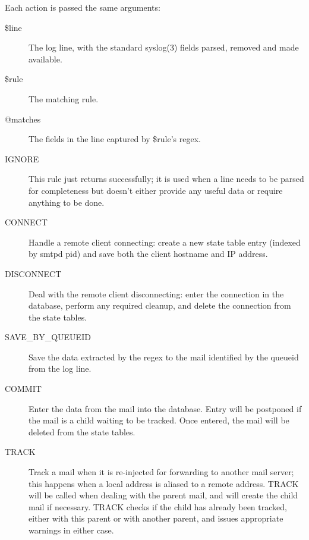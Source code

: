 \documentclass[a4paper,12pt,draft]{article}
\begin{document}
Each action is passed the same arguments: 

\begin{description}

    \item [\$line] The log line, with the standard syslog(3) fields parsed,
        removed and made available.
        
    \item [\$rule] The matching rule.
        
    \item [@matches] The fields in the line captured by \$rule's regex.

\end{description}

\begin{description}

    \item [IGNORE] This rule just returns successfully; it is used when a
        line needs to be parsed for completeness but doesn't either provide
        any useful data or require anything to be done.

    \item [CONNECT] Handle a remote client connecting: create a new state
        table entry (indexed by smtpd pid) and save both the client
        hostname and IP address.

    \item [DISCONNECT] Deal with the remote client disconnecting: enter the
        connection in the database, perform any required cleanup, and
        delete the connection from the state tables.

    \item [SAVE\_BY\_QUEUEID] Save the data extracted by the regex to the
        mail identified by the queueid from the log line.

    \item [COMMIT] Enter the data from the mail into the database. Entry
        will be postponed if the mail is a child waiting to be tracked.
        Once entered, the mail will be deleted from the state tables.

    \item [TRACK] Track a mail when it is re-injected for forwarding to
        another mail server; this happens when a local address is aliased
        to a remote address.  TRACK will be called when dealing with the
        parent mail, and will create the child mail if necessary. TRACK
        checks if the child has already been tracked, either with this
        parent or with another parent, and issues appropriate warnings in
        either case.


\end{description}
\end{document}
